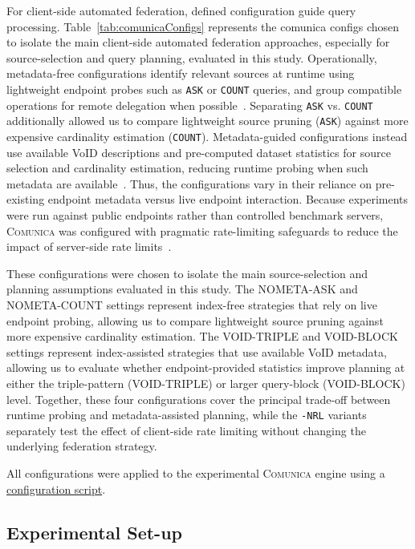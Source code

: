 \documentclass[runningheads]{llncs}
\begin{document}
For client-side automated federation, defined configuration guide query processing.
Table~\ref{tab:comunicaConfigs} represents the comunica configs chosen to isolate the main client-side automated federation approaches, especially for source-selection and query planning, evaluated in this study.
Operationally, metadata-free configurations identify relevant sources at runtime using lightweight endpoint probes such as \texttt{ASK} or \texttt{COUNT} queries, and group compatible operations for remote delegation when possible~\cite{schwarte2011fedx}. 
Separating \texttt{ASK} vs. \texttt{COUNT} additionally allowed us to compare lightweight source pruning (\texttt{ASK}) against more expensive cardinality estimation (\texttt{COUNT}).
Metadata-guided configurations instead use available VoID descriptions and pre-computed dataset statistics for source selection and cardinality estimation, reducing runtime probing when such metadata are available~\cite{splendid2011,w3cvoid,hagedorn2014resource}. 
Thus, the configurations vary in their reliance on pre-existing endpoint metadata versus live endpoint interaction.
Because experiments were run against public endpoints rather than controlled benchmark servers, \textsc{Comunica} was configured with pragmatic rate-limiting safeguards to reduce the impact of server-side rate limits~\cite{rfc9110}. 

These configurations were chosen to isolate the main source-selection and planning assumptions evaluated in this study.
The \textsc{NOMETA-ASK} and \textsc{NOMETA-COUNT} settings represent index-free strategies that rely on live endpoint probing, allowing us to compare lightweight source pruning against more expensive cardinality estimation.
The \textsc{VOID-TRIPLE} and \textsc{VOID-BLOCK} settings represent index-assisted strategies that use available VoID metadata, allowing us to evaluate whether endpoint-provided statistics improve planning at either the triple-pattern (\textsc{VOID-TRIPLE}) or larger query-block (\textsc{VOID-BLOCK}) level.
Together, these four configurations cover the principal trade-off between runtime probing and metadata-assisted planning, while the \texttt{-NRL} variants separately test the effect of client-side rate limiting without changing the underlying federation strategy.

All configurations were applied to the experimental \textsc{Comunica} engine using a \href{https://github.com/ecrum19/fed-sparql-survey-expts/blob/main/comunica_configuration.py}{configuration script}.


\subsection{Experimental Set-up}\label{sec4.4}
\end{document}

